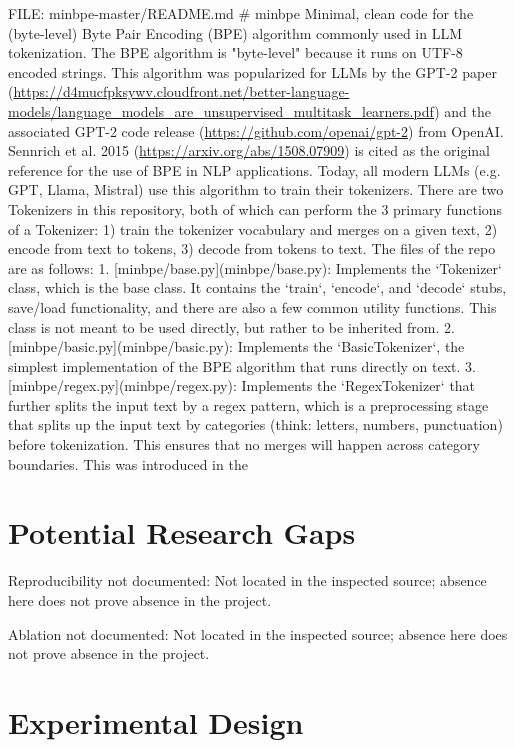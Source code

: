 \documentclass[conference]{IEEEtran}
\begin{document}
FILE: minbpe-master/README.md \# minbpe Minimal, clean code for the (byte-level) Byte Pair Encoding (BPE) algorithm commonly used in LLM tokenization. The BPE algorithm is "byte-level" because it runs on UTF-8 encoded strings. This algorithm was popularized for LLMs by the GPT-2 paper (\url{https://d4mucfpksywv.cloudfront.net/better-language-models/language_models_are_unsupervised_multitask_learners.pdf}) and the associated GPT-2 code release (\url{https://github.com/openai/gpt-2}) from OpenAI. Sennrich et al. 2015 (\url{https://arxiv.org/abs/1508.07909}) is cited as the original reference for the use of BPE in NLP applications. Today, all modern LLMs (e.g. GPT, Llama, Mistral) use this algorithm to train their tokenizers. There are two Tokenizers in this repository, both of which can perform the 3 primary functions of a Tokenizer: 1) train the tokenizer vocabulary and merges on a given text, 2) encode from text to tokens, 3) decode from tokens to text. The files of the repo are as follows: 1. [minbpe/base.py](minbpe/base.py): Implements the `Tokenizer` class, which is the base class. It contains the `train`, `encode`, and `decode` stubs, save/load functionality, and there are also a few common utility functions. This class is not meant to be used directly, but rather to be inherited from. 2. [minbpe/basic.py](minbpe/basic.py): Implements the `BasicTokenizer`, the simplest implementation of the BPE algorithm that runs directly on text. 3. [minbpe/regex.py](minbpe/regex.py): Implements the `RegexTokenizer` that further splits the input text by a regex pattern, which is a preprocessing stage that splits up the input text by categories (think: letters, numbers, punctuation) before tokenization. This ensures that no merges will happen across category boundaries. This was introduced in the 

\section{Potential Research Gaps}

Reproducibility not documented: Not located in the inspected source; absence here does not prove absence in the project.

Ablation not documented: Not located in the inspected source; absence here does not prove absence in the project.

\section{Experimental Design}
\end{document}
